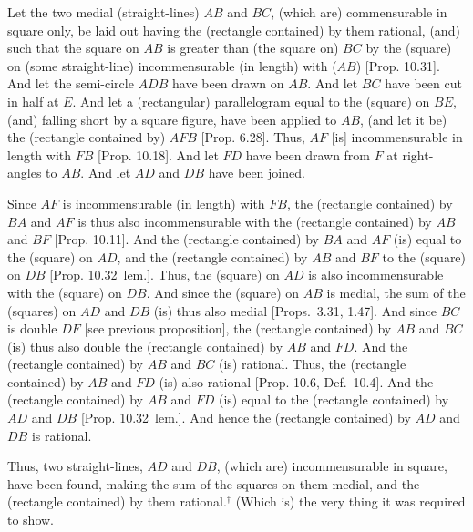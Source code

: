 \begin{Parallel}{}{}
{
\centerline{}

Let the two medial (straight-lines) $AB$ and $BC$,
(which are) commensurable in square only, be laid out having the
(rectangle contained) by them rational, (and) such that the square on
$AB$ is greater than (the square on) $BC$ by the (square) on (some straight-line)
incommensurable (in length) with ($AB$) [Prop. 10.31].
And let the semi-circle $ADB$ have been drawn on $AB$.
And let $BC$ have been cut in half at $E$. And let a (rectangular) parallelogram
equal to the (square) on $BE$, (and) falling short by a square figure,
have been applied to $AB$, (and let it be) the (rectangle
contained by) $AFB$ [Prop. 6.28].
Thus, $AF$ [is] incommensurable in length with $FB$
[Prop. 10.18]. And let 
$FD$ have been drawn from $F$ at right-angles to $AB$.
And let $AD$ and $DB$ have been joined.

Since $AF$ is incommensurable (in length) with $FB$, the (rectangle contained) by
$BA$ and $AF$ is thus also incommensurable with the (rectangle contained)
by $AB$ and $BF$ [Prop. 10.11].  And the
(rectangle contained) by $BA$ and $AF$ (is) equal to the (square) on $AD$, and the (rectangle contained) by $AB$ and $BF$ to the (square) on $DB$
[Prop. 10.32~lem.]. Thus, the (square) on
$AD$ is also incommensurable with the (square) on $DB$. And
since the (square) on $AB$ is medial, the sum of the (squares) on
$AD$ and $DB$ (is) thus also medial [Props.~3.31, 1.47]. And since $BC$ is double $DF$ [see previous proposition], the (rectangle
contained) by $AB$ and $BC$ (is) thus also double the (rectangle contained)
by $AB$ and $FD$. And the (rectangle contained) by $AB$ and $BC$ (is)
rational. Thus, the (rectangle contained) by $AB$ and $FD$
(is) also rational [Prop. 10.6, Def.~10.4]. And the (rectangle contained) by
$AB$ and $FD$ (is) equal to the (rectangle contained) by $AD$ and $DB$
[Prop. 10.32~lem.]. And hence the (rectangle
contained) by $AD$ and $DB$ is rational.

Thus, two straight-lines, $AD$ and $DB$, (which are) incommensurable
in square, have been found, making the sum of the squares on them medial,
and the (rectangle contained) by them rational.$^\dag$
(Which is) the very thing
it was required to show.}
\end{Parallel}



